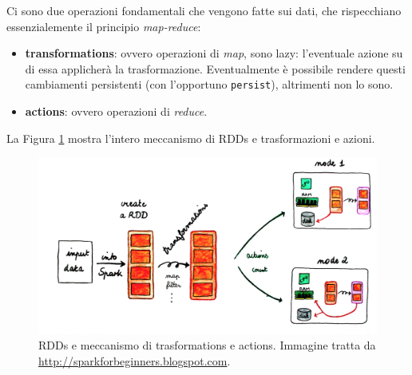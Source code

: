 \documentclass[12pt,italian]{article}
\begin{document}
Ci sono due operazioni fondamentali che vengono fatte sui dati, che rispecchiano essenzialemente il principio \textit{map-reduce}:
\begin{itemize}
	\item \textbf{transformations}: ovvero operazioni di \textit{map}, sono lazy: l'eventuale azione su di essa applicherà la trasformazione. Eventualmente è possibile rendere questi cambiamenti persistenti (con l'opportuno \texttt{persist}), altrimenti non lo sono.
	\item \textbf{actions}: ovvero operazioni di \textit{reduce}.
\end{itemize}
La Figura \ref{fig:RDDs} mostra l'intero meccanismo di RDDs e trasformazioni e azioni.
\begin{figure}
	\centering 
	\includegraphics[width=1\linewidth]{img/rdds.png}
	\caption{RDDs e meccanismo di trasformations e actions. Immagine tratta da \url{http://sparkforbeginners.blogspot.com}.}
	\label{fig:RDDs}
\end{figure}
\end{document}
